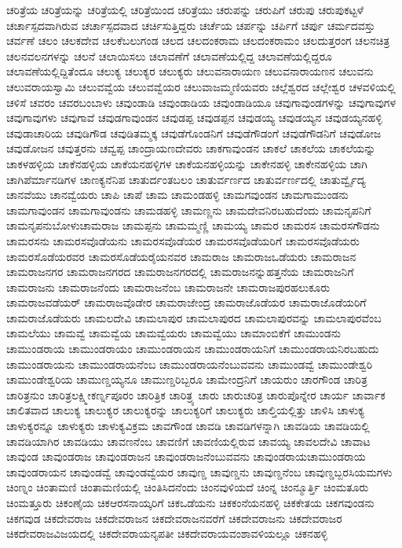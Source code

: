 {ಚರಿತ್ರೆಯ
ಚರಿತ್ರೆಯನ್ನು
ಚರಿತ್ರೆಯಲ್ಲಿ
ಚರಿತ್ರೆಯಿಂದ
ಚರಿತ್ರೆಯು
ಚರುಪನ್ನು
ಚರುಪಿಗೆ
ಚರುಪು
ಚರುಪುಕಟ್ಟಳೆ
ಚರ್ಚಾಸ್ಪದವಾಗಿರುವ
ಚರ್ಚಾಸ್ಪದವಾದ
ಚರ್ಚಿಸುತ್ತಿದ್ದರು
ಚರ್ಚೆಯ
ಚರ್ಪನ್ನು
ಚರ್ಪಿಗೆ
ಚರ್ಪು
ಚರ್ಮದವಸ್ತು
ಚರ್ವಣೆ
ಚಲಂ
ಚಲಕದೇವ
ಚಲಕೆಬಲುಗಂಡ
ಚಲದ
ಚಲದಂಕರಾಮ
ಚಲದಂಕರಾಮಂ
ಚಲದುತ್ತರಂಗ
ಚಲನಚಿತ್ರ
ಚಲನವಲನಗಳನ್ನು
ಚಲನೆ
ಚಲಾಯಿಸಲು
ಚಲಾವಣೆಗೆ
ಚಲಾವಣೆಯಲ್ಲಿದ್ದ
ಚಲಾವಣೆಯಲ್ಲಿದ್ದರೂ
ಚಲಾವಣೆಯಲ್ಲಿದ್ದಿತೆಂದೂ
ಚಲುಕ್ಯ
ಚಲುಕ್ಯರ
ಚಲುಕ್ಯರು
ಚಲುವನಾರಾಯಣ
ಚಲುವನಾರಾಯಣನ
ಚಲುವನು
ಚಲುವರಾಯಸ್ವಾಮಿ
ಚಲುವವ್ವೆಯ
ಚಲುವವ್ವೆಯರ
ಚಲುವಾಜಮ್ಮಣಿಯವರು
ಚಲ್ಲೆಶ್ವರದ
ಚಲ್ಲೇಶ್ವರ
ಚಳವಳಿಯಲ್ಲಿ
ಚಳಿಸೆ
ಚವರಂ
ಚವರಬಂಬಾಳು
ಚವುಂಡಾಡಿ
ಚವುಂಡಾಡಿಯ
ಚವುಂಡಾಡಿಯೂ
ಚವುಗಾವುಂಡಗಳನ್ನು
ಚವುಗಾವುಗಳ
ಚವುಗಾವುಗಳು
ಚವುಗಾವೆ
ಚವುಡಗಾವುಂಡನ
ಚವುಡಪ್ಪ
ಚವುಡಪ್ಪನ
ಚವುಡಯ್ಯ
ಚವುಡಯ್ಯನ
ಚವುಡಯ್ಯನಹಳ್ಳಿ
ಚವುಡಾಚಾರಿಯ
ಚವುಡಿಗೌಡ
ಚವುಡಿತಮ್ಮಕ್ಕ
ಚವುಡೆಗೊಂಡನಿಗೆ
ಚವುಡೆಗೌಡಂಗೆ
ಚವುಡೆಗೌಡನಿಗೆ
ಚವುಡೋಜ
ಚವುಡೋಜನ
ಚವುತ್ತರನು
ಚವ್ವಪ್ಪ
ಚಾಂದ್ರಾಯಣದೇವರು
ಚಾಕಗಾವುಂಡನ
ಚಾಕಲೆ
ಚಾಕಲೆಯ
ಚಾಕಲೆಯನ್ನು
ಚಾಕಳಹಳ್ಳಿಯ
ಚಾಕೆನಹಳ್ಳಿಯ
ಚಾಕೆಯನಹಳ್ಳಿಗಳ
ಚಾಕೆಯನಹಳ್ಳಿಯನ್ನು
ಚಾಕೇನಹಳ್ಳಿ
ಚಾಕೇನಹಳ್ಳಿಯ
ಚಾಗಿ
ಚಾಗಿಪೆರ್ಮಾನಡಿಗಳ
ಚಾಣಕ್ಯನೆನಿಪ
ಚಾತುರ್ದಂತಬಲಂ
ಚಾತುರ್ವರ್ಣದ
ಚಾತುರ್ವರ್ಣದಲ್ಲಿ
ಚಾತುರ್ವ್ವೈದ್ಯ
ಚಾನವೆಯು
ಚಾನವ್ವೆಯರು
ಚಾಪಿ
ಚಾಪೆ
ಚಾಮ
ಚಾಮಂಡಹಳ್ಳಿ
ಚಾಮಗವುಂಡನ
ಚಾಮಗಾಮುಂಡನು
ಚಾಮಗಾವುಂಡನ
ಚಾಮಗಾವುಂಡನು
ಚಾಮಡಹಳ್ಳಿ
ಚಾಮಣ್ಣನು
ಚಾಮದೇವನಿರಬಹುದೆಂದು
ಚಾಮನೃಪನಿಗೆ
ಚಾಮನೃಪನುಬೋಳುಚಾಮರಾಜ
ಚಾಮಪ್ಪನು
ಚಾಮಮ್ಮಣ್ಣಿ
ಚಾಮಯ್ಯ
ಚಾಮರ
ಚಾಮರಸ
ಚಾಮರಸಗೌಡನು
ಚಾಮರಸನು
ಚಾಮರಸವೊಡೆಯನು
ಚಾಮರಸವೊಡೆಯರ
ಚಾಮರಸವೊಡೆಯರಿಗೆ
ಚಾಮರಸವೊಡೆಯರು
ಚಾಮರಸೊಡೆಯರವರ
ಚಾಮರಸೊಡೆಯರೈಯನವರ
ಚಾಮರಾಜ
ಚಾಮರಾಜಒಡೆಯರು
ಚಾಮರಾಜನ
ಚಾಮರಾಜನಗರ
ಚಾಮರಾಜನಗರದ
ಚಾಮರಾಜನಗರದಲ್ಲಿ
ಚಾಮರಾಜನನ್ನುಹತ್ತನೆಯ
ಚಾಮರಾಜನಿಗೆ
ಚಾಮರಾಜನು
ಚಾಮರಾಜನೆಂದು
ಚಾಮರಾಜನೆಂಬ
ಚಾಮರಾಜನೇ
ಚಾಮರಾಜಪುರಹಲುಕೂರು
ಚಾಮರಾಜವಡೆಯರ್
ಚಾಮರಾಜವೊಡೇರ
ಚಾಮರಾಜೇಂದ್ರ
ಚಾಮರಾಜೊಡೆಯರ
ಚಾಮರಾಜೊಡೆಯರಿಗೆ
ಚಾಮರಾಜೊಡೆಯರು
ಚಾಮಲದೇವಿ
ಚಾಮಲಾಪುರ
ಚಾಮಲಾಪುರದ
ಚಾಮಲಾಪುರವನ್ನು
ಚಾಮಲಾಪುರವೆಂಬ
ಚಾಮಲೆಯು
ಚಾಮವ್ವೆ
ಚಾಮವ್ವೆಯ
ಚಾಮವ್ವೆಯರು
ಚಾಮವ್ವೆಯು
ಚಾಮಾಂಬಿಕೆಗೆ
ಚಾಮುಂಡನು
ಚಾಮುಂಡರಾಯ
ಚಾಮುಂಡರಾಯಂ
ಚಾಮುಂಡರಾಯನ
ಚಾಮುಂಡರಾಯನಿಗೆ
ಚಾಮುಂಡರಾಯನಿರಬಹುದು
ಚಾಮುಂಡರಾಯನು
ಚಾಮುಂಡರಾಯನೆಂಬ
ಚಾಮುಂಡರಾಯನೆಂಬುವವನು
ಚಾಮುಂಡವ್ವೆ
ಚಾಮುಂಡೇಶ್ವರಿ
ಚಾಮುಂಡೇಶ್ವರಿಯ
ಚಾಮುಣ್ಡಯ್ಯನೂ
ಚಾಮುಣ್ಡರಿಬ್ಬರೂ
ಚಾಮೇಂದ್ರನಿಗೆ
ಚಾಯರುಂ
ಚಾರಗೌಂಡ
ಚಾರಿತ್ರ
ಚಾರಿತ್ರನುಂ
ಚಾರಿತ್ರಲಕ್ಷ್ಮೀಕರ್ಣ್ನಪೂರಂ
ಚಾರಿತ್ರಿಕ
ಚಾರಿತ್ರ್ಯ
ಚಾರು
ಚಾರುಚರಿತ್ರ
ಚಾರುಪೊನ್ನೇರ
ಚಾರ್ಯ
ಚಾರ್ವಾಕ
ಚಾಲಿತವಾದ
ಚಾಲುಕ್ಯ
ಚಾಲುಕ್ಯರ
ಚಾಲುಕ್ಯರನ್ನು
ಚಾಲುಕ್ಯರಿಗೆ
ಚಾಲುಕ್ಯರು
ಚಾಲ್ತಿಯಲ್ಲಿತ್ತು
ಚಾಳಿಸಿ
ಚಾಳುಕ್ಯ
ಚಾಳುಕ್ಯರನ್ನೂ
ಚಾಳುಕ್ಯರು
ಚಾಳುಕ್ಯವಿಕ್ರಮ
ಚಾವಗೌಂಡ
ಚಾವಡಿ
ಚಾವಡಿಗಳನ್ನಾಗಿ
ಚಾವಡಿಯ
ಚಾವಡಿಯಲ್ಲಿ
ಚಾವಡಿಯಾಗಿರ
ಚಾವಡಿಯು
ಚಾವಣನೆಂಬ
ಚಾವಣಿಗೆ
ಚಾವಣಿಯಲ್ಲಿರುವ
ಚಾವಯ್ಯ
ಚಾವಲದೇವಿ
ಚಾವಾಟ
ಚಾವುಂಡ
ಚಾವುಂಡರಾಜ
ಚಾವುಂಡರಾಜನ
ಚಾವುಂಡರಾಜನೆಂಬುವವನು
ಚಾವುಂಡರಾಯಚಾಮುಂಡರಾಯ
ಚಾವುಂಡರಾಯನ
ಚಾವುಂಡವ್ವೆ
ಚಾವುಂಡವ್ವೆಯರ
ಚಾವುಣ್ಡ
ಚಾವುಣ್ಡನು
ಚಾವುಣ್ಡನೆಂಬ
ಚಾವುಣ್ಡಬ್ಬರಸಿಯಮಗಳು
ಚಿಂಣ್ನಂ
ಚಿಂತಾಮಣಿ
ಚಿಂತಾಮಣಿಯಲ್ಲಿ
ಚಿಂತಿಸಿದನೆಂದು
ಚಿಂನವುಳಿಯದೆ
ಚಿಂನ್ನ
ಚಿಂನ್ಮೂರ್ತ್ತಿ
ಚಿಂಮತೂರು
ಚಿಂಮತ್ತೂರು
ಚಿಕಂಣೈಯ
ಚಿಕಆರಸನಾಯ್ಕರಿಗೆ
ಚಿಕಒಡೆಯನು
ಚಿಕಕಂನೆಯನಹಳ್ಳಿ
ಚಿಕಕೇತಯ
ಚಿಕಗವುಂಡನು
ಚಿಕಗವುಡ
ಚಿಕದೇವರಾಜ
ಚಿಕದೇವರಾಜನ
ಚಿಕದೇವರಾಜನವರೆಗೆ
ಚಿಕದೇವರಾಜನು
ಚಿಕದೇವರಾಜರ
ಚಿಕದೇವರಾಜವಿಜಯದಲ್ಲಿ
ಚಿಕದೇವರಾಯನೃಪತೀ
ಚಿಕದೇವರಾಯವಂಶಾವಳಿಯಲ್ಲೂ
ಚಿಕನಹಳ್ಳಿ
}

